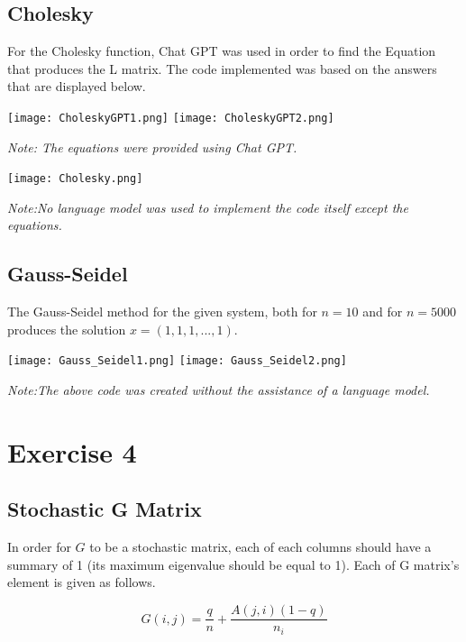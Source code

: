 \documentclass{article}
\begin{document}
\subsection{Cholesky}
For the Cholesky function, Chat GPT was used in order to find the Equation that produces the L matrix. The code implemented was based on the answers that are displayed below.

\begin{tcolorbox}[colback=gray!10, colframe=gray!80, width=\textwidth, sharp corners]
    \centering 
    \texttt{[image: CholeskyGPT1.png]} 
    \texttt{[image: CholeskyGPT2.png]} 
    

    \vspace{0.2cm} 
    
    \small\textit{Note: The equations were provided using Chat GPT.}
\end{tcolorbox}

\begin{tcolorbox}[colback=gray!10, colframe=gray!80, width=\textwidth, sharp corners]
    \centering 
    \texttt{[image: Cholesky.png]}     

    \vspace{0.2cm} 
    
    \small\textit{Note:No language model was used to implement the code itself except the equations.}
\end{tcolorbox}
\subsection{Gauss-Seidel}
The Gauss-Seidel method for the given system, both for $n = 10$ and for $n=5000$
produces the solution $x=(1,1,1,...,1)$.
\begin{tcolorbox}[colback=gray!10, colframe=gray!80, width=\textwidth, sharp corners]
    \centering 
    \texttt{[image: Gauss\_Seidel1.png]} 
    \texttt{[image: Gauss\_Seidel2.png]}     


    \vspace{0.2cm} 
    
    \small\textit{Note:The above code was created without the assistance of a language model.}
\end{tcolorbox}


\section{Exercise 4}
\subsection{Stochastic G Matrix}
In order for $G$ to be a stochastic matrix, each of each columns should have a summary of 1 (its maximum eigenvalue should be equal to 1).
Each of  G matrix's element is given as follows.
\begin{center}
\begin{equation*}      
       G(i,j)=\frac{q}{n} + \frac{A(j,i)(1-q)}{n_i}
\end{equation*}

\end{center}
\end{document}
